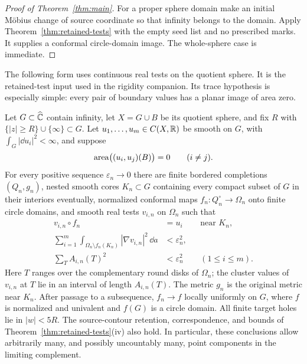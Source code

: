 \begin{proof}[Proof of Theorem~\ref{thm:main}]
For a proper sphere domain make an initial M\"obius change of source
coordinate so that infinity belongs to the domain.  Apply
Theorem~\ref{thm:retained-tests} with the empty seed list and no
prescribed marks.  It supplies a conformal circle-domain image.
The whole-sphere case is immediate.
\end{proof}

The following form uses continuous real tests on the quotient sphere.
It is the retained-test input used in the rigidity companion.  Its
trace hypothesis is especially simple: every pair of boundary values
has a planar image of area zero.

\begin{corollary}\label{cor:scalar-retained-tests}
Let $G\subset\widehat{\mathbb C}$ contain infinity, let $X=G\cup B$ be its quotient
sphere, and fix $R$ with $\{|z|\ge R\}\cup\{\infty\}\subset G$.
Let $u_1,\ldots,u_m\in C(X,\mathbb R)$ be smooth on $G$, with
$\int_G|\dd u_i|^2<\infty$, and suppose
\begin{equation}\label{eq:scalar-pair-null}
 \operatorname{area}\bigl((u_i,u_j)(B)\bigr)=0\qquad(i\ne j).
\end{equation}
For every positive sequence $\varepsilon_n\to0$ there are finite
bordered completions $(Q_n,g_n)$, nested smooth cores $K_n\subset G$
containing every compact subset of $G$ in their interiors eventually,
normalized conformal maps $f_n:Q_n^\circ\to\Omega_n$ onto finite
circle domains, and smooth real tests $v_{i,n}$ on $\Omega_n$ such that
\begin{align}
 v_{i,n}\circ f_n&=u_i
   &&\text{near }K_n,\label{eq:scalar-core}\\
 \sum_{i=1}^m\int_{\Omega_n\setminus f_n(K_n)}
             |\nabla v_{i,n}|^2\,\dd a
   &<\varepsilon_n^2,\label{eq:scalar-tail}\\
 \sum_T A_{i,n}(T)^2&<\varepsilon_n^2
   &&(1\le i\le m).\label{eq:scalar-oscillation}
\end{align}
Here $T$ ranges over the complementary round disks of $\Omega_n$;
the cluster values of $v_{i,n}$ at $T$ lie in an interval of length
$A_{i,n}(T)$.  The metric $g_n$ is the original metric near $K_n$.
After passage to a subsequence, $f_n\to f$ locally uniformly on $G$,
where $f$ is normalized and univalent and $f(G)$ is a circle domain.
All finite target holes lie in $|w|<5R$.  The source-contour retention,
correspondence, and bounds of Theorem~\ref{thm:retained-tests}\textup{(iv)}
also hold.  In particular, these conclusions allow arbitrarily many,
and possibly uncountably many, point components in the limiting
complement.
\end{corollary}

